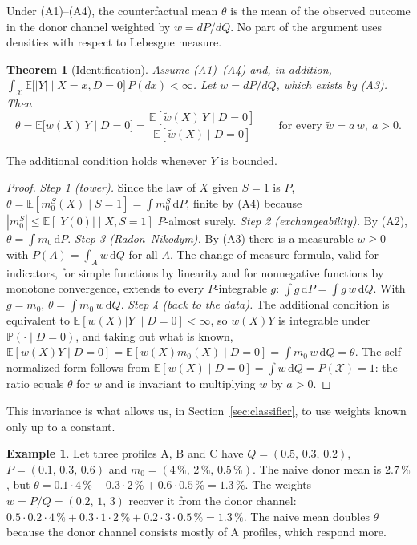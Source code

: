 \documentclass[11pt,a4paper]{article}
\newcommand{\E}{\mathbb{E}}
\newcommand{\PP}{\mathbb{P}}
\newcommand{\X}{\mathcal{X}}
\newcommand{\dd}{\,\mathrm{d}}
\theoremstyle{plain}
\newtheorem{theorem}{Theorem}
\theoremstyle{definition}
\newtheorem{example}{Example}
\begin{document}
Under (A1)--(A4), the counterfactual mean $\theta$ is the mean of the observed outcome in the donor channel weighted by $w=dP/dQ$. No part of the argument uses densities with respect to Lebesgue measure.

\begin{theorem}[Identification]\label{thm:identification}
Assume (A1)--(A4) and, in addition, $\int_\X\E\bigl[|Y|\mid X=x,D=0\bigr]\,P(dx)<\infty$. Let $w=dP/dQ$, which exists by (A3). Then
\[
\theta=\E\bigl[w(X)\,Y\mid D=0\bigr]=\frac{\E[\tilde w(X)\,Y\mid D=0]}{\E[\tilde w(X)\mid D=0]}\qquad\text{for every }\tilde w=a\,w,\ a>0.
\]
\end{theorem}
The additional condition holds whenever $Y$ is bounded.

\begin{proof}
\emph{Step 1 (tower).} Since the law of $X$ given $S=1$ is $P$, $\theta=\E[m_0^S(X)\mid S=1]=\int m_0^S\dd P$, finite by (A4) because $|m_0^S|\le\E[|Y(0)|\mid X,S=1]$ $P$-almost surely.
\emph{Step 2 (exchangeability).} By (A2), $\theta=\int m_0\dd P$.
\emph{Step 3 (Radon--Nikodym).} By (A3) there is a measurable $w\ge0$ with $P(A)=\int_A w\dd Q$ for all $A$. The change-of-measure formula, valid for indicators, for simple functions by linearity and for nonnegative functions by monotone convergence, extends to every $P$-integrable $g$: $\int g\dd P=\int g\,w\dd Q$. With $g=m_0$, $\theta=\int m_0\,w\dd Q$.
\emph{Step 4 (back to the data).} The additional condition is equivalent to $\E[w(X)|Y|\mid D=0]<\infty$, so $w(X)Y$ is integrable under $\PP(\cdot\mid D=0)$, and taking out what is known, $\E[w(X)Y\mid D=0]=\E[w(X)m_0(X)\mid D=0]=\int m_0\,w\dd Q=\theta$.
The self-normalized form follows from $\E[w(X)\mid D=0]=\int w\dd Q=P(\X)=1$: the ratio equals $\theta$ for $w$ and is invariant to multiplying $w$ by $a>0$.
\end{proof}

This invariance is what allows us, in Section~\ref{sec:classifier}, to use weights known only up to a constant.

\begin{example}\label{ex:toy}
Let three profiles A, B and C have $Q=(0.5,\,0.3,\,0.2)$, $P=(0.1,\,0.3,\,0.6)$ and $m_0=(4\,\%,\,2\,\%,\,0.5\,\%)$. The naive donor mean is $2.7\,\%$, but $\theta=0.1\cdot4\,\%+0.3\cdot2\,\%+0.6\cdot0.5\,\%=1.3\,\%$. The weights $w=P/Q=(0.2,\,1,\,3)$ recover it from the donor channel: $0.5\cdot0.2\cdot4\,\%+0.3\cdot1\cdot2\,\%+0.2\cdot3\cdot0.5\,\%=1.3\,\%$. The naive mean doubles $\theta$ because the donor channel consists mostly of A profiles, which respond more.
\end{example}
\end{document}
